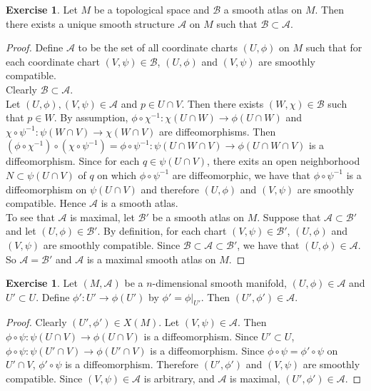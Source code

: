 \documentclass[12pt]{amsart}
\theoremstyle{definition}
\newtheorem{ex}[definition]{Exercise}
\newcommand{\MA}{\mathcal{A}}
\newcommand{\MB}{\mathcal{B}}
\begin{document}
	\begin{ex}
		Let $M$ be a topological space and $\MB$ a smooth atlas on $M$. Then there exists a unique smooth structure $\MA$ on $M$ such that $\MB \subset \MA$.
	\end{ex}

	\begin{proof}
		Define $\MA$ to be the set of all coordinate charts $(U, \phi)$ on $M$ such that for each coordinate chart $(V, \psi) \in \MB$,  $(U, \phi)$ and $(V, \psi) $ are smoothly compatible. \\
		Clearly $\MB \subset \MA$. \\
		Let $(U, \phi), (V, \psi) \in \MA$ and $p \in U \cap V$. Then there exists $(W, \chi) \in \MB$ such that $p \in W$. By assumption, $\phi \circ \chi^{-1} : \chi(U \cap W) \rightarrow \phi(U \cap W)$ and $ \chi \circ \psi^{-1} : \psi(W \cap V) \rightarrow \chi(W \cap V)$ are diffeomorphisms. Then $ (\phi \circ \chi^{-1}) \circ (\chi \circ \psi^{-1}) = \phi \circ \psi^{-1}: \psi(U \cap W \cap V) \rightarrow  \phi(U \cap W \cap V) $ is a diffeomorphism.  Since for each $q \in \psi(U \cap V)$, there exits an open neighborhood $N \subset \psi(U \cap V)$ of $q$ on which $\phi \circ \psi^{-1}$ are diffeomorphic, we have that $\phi \circ \psi^{-1}$ is a diffeomorphism on $\psi(U \cap V)$ and therefore $(U, \phi)$ and $ (V, \psi)$ are smoothly compatible. Hence $\MA$ is a smooth atlas.\\
		To see that $\MA$ is maximal, let $\MB'$ be a smooth atlas on $M$. Suppose that $\MA \subset \MB'$ and let $(U, \phi) \in \MB'$. By definition, for each chart $(V, \psi) \in \MB'$, $(U, \phi)$ and $(V, \psi)$ are smoothly compatible. Since $\MB \subset \MA \subset \MB'$, we have that $(U, \phi) \in \MA$. So $\MA = \MB'$ and $\MA$ is a maximal smooth atlas on $M$.
	\end{proof}

	\begin{ex}
		Let $(M, \MA)$ be a $n$-dimensional smooth manifold, $(U, \phi) \in \MA$ and $U' \subset U$. Define $\phi': U' \rightarrow \phi(U')$ by $\phi' = \phi|_{U'}$. Then $(U', \phi') \in \MA$. 
	\end{ex}

	\begin{proof}
		Clearly $(U', \phi') \in X(M)$. Let $(V, \psi) \in \MA$. Then $\phi \circ \psi: \psi(U \cap V) \rightarrow \phi(U \cap V)$ is a diffeomorphism. Since $U' \subset U$, $\phi \circ \psi: \psi(U' \cap V) \rightarrow \phi(U' \cap V)$ is a diffeomorphism. Since $\phi \circ \psi = \phi' \circ \psi$ on $U' \cap V$, $\phi' \circ \psi$ is a diffeomorphism. Therefore $(U', \phi')$ and $(V, \psi)$ are smoothly compatible. Since $(V, \psi) \in \MA$ is arbitrary, and $\MA$ is maximal, $(U', \phi') \in \MA$.
	\end{proof}
\end{document}
